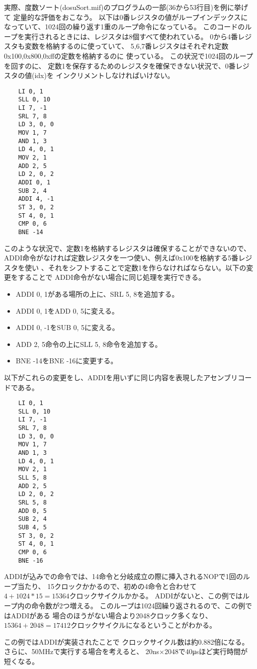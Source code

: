 \documentclass[a4j,titlepage]{jarticle}
\begin{document}
実際、度数ソート(dosuSort.mif)のプログラムの一部(36から53行目)を例に挙げて
定量的な評価をおこなう。
以下は0番レジスタの値がループインデックスになっていて、1024回の繰り返す1重のループ命令になっている。
このコードのループを実行されるときには、レジスタは8個すべて使われている。
0から4番レジスタも変数を格納するのに使っていて、
5,6,7番レジスタはそれぞれ定数0x100,0x800,0xffの定数を格納するのに
使っている。
この状況で1024回のループを回すのに、
定数1を保存するためのレジスタを確保できない状況で、0番レジスタの値(idx)を
インクリメントしなければいけない。
\begin{screen}
\begin{verbatim}
    LI 0, 1
    SLL 0, 10
    LI 7, -1
    SRL 7, 8
    LD 3, 0, 0
    MOV 1, 7
    AND 1, 3
    LD 4, 0, 1
    MOV 2, 1
    ADD 2, 5
    LD 2, 0, 2
    ADDI 0, 1
    SUB 2, 4
    ADDI 4, -1
    ST 3, 0, 2
    ST 4, 0, 1
    CMP 0, 6
    BNE -14
\end{verbatim}
\end{screen}
このような状況で、定数1を格納するレジスタは確保することができないので、
ADDI命令がなければ定数レジスタを一つ使い、例えば0x100を格納する5番レジスタを使い
、それをシフトすることで定数1を作らなければならない。以下の変更をすることで
ADDI命令がない場合に同じ処理を実行できる。
\begin{itemize}
    \item ADDI 0, 1がある場所の上に、SRL 5, 8を追加する。
    \item ADDI 0, 1をADD 0, 5に変える。
    \item ADDI 0, -1をSUB 0, 5に変える。
    \item ADD 2, 5命令の上にSLL 5, 8命令を追加する。
    \item BNE -14をBNE -16に変更する。
\end{itemize}
以下がこれらの変更をし、ADDIを用いずに同じ内容を表現したアセンブリコードである。
\begin{screen}
\begin{verbatim}
    LI 0, 1
    SLL 0, 10
    LI 7, -1
    SRL 7, 8
    LD 3, 0, 0
    MOV 1, 7
    AND 1, 3
    LD 4, 0, 1
    MOV 2, 1
    SLL 5, 8
    ADD 2, 5
    LD 2, 0, 2
    SRL 5, 8
    ADD 0, 5
    SUB 2, 4
    SUB 4, 5
    ST 3, 0, 2
    ST 4, 0, 1
    CMP 0, 6
    BNE -16
\end{verbatim}
\end{screen}
ADDIが込みでの命令では、14命令と分岐成立の際に挿入されるNOPで1回のループ当たり、
15クロックかかるので、初めの4命令と合わせて$4+1024*15=15364$クロックサイクルかかる。
ADDIがないと、この例ではループ内の命令数が2つ増える。
このループは1024回繰り返されるので、この例ではADDIがある
場合のほうがない場合より2048クロック多くなり、$15364+2048=17412$クロックサイクルになるということがわかる。

この例ではADDIが実装されたことで
クロックサイクル数は約0.882倍になる。
さらに、50MHzで実行する場合を考えると、
20ns×2048で40μsほど実行時間が短くなる。
\end{document}

